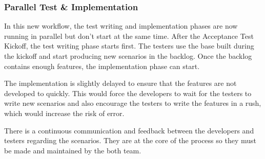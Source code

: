 \subsubsection{Parallel Test \& Implementation}
In this new workflow, the test writing and implementation phases are now
running in parallel but don't start at the same time.
After the Acceptance Test Kickoff, the test writing phase starts first.
The testers use the base built during the kickoff and start producing new
scenarios in the backlog.
Once the backlog contains enough features, the implementation phase can start.

The implementation is slightly delayed to ensure that the features are not
developed to quickly.
This would force the developers to wait for the testers to write new
scenarios and also encourage the testers to write the features in a rush, which
would increase the risk of error.

There is a continuous communication and feedback between the developers and
testers regarding the scenarios.
They are at the core of the process so they must be made and maintained by
the both team.
